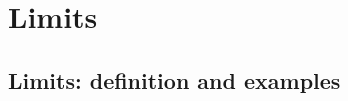 \chapter{Limits}



\section{Limits: definition and examples}
\addtocounter{subsection}{32}









